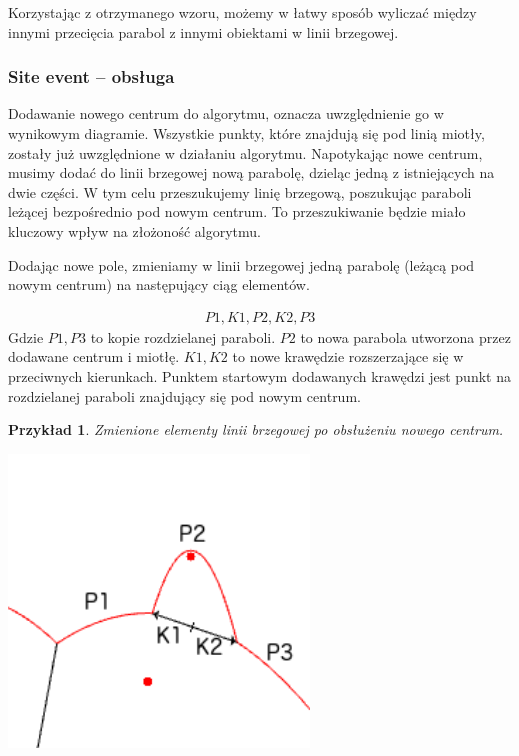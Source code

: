 \documentclass[declaration,shortabstract, inz]{iithesis}
\theoremstyle{definition} \newtheorem{definition}{Definicja}[]
\theoremstyle{plain} \newtheorem{remark}[definition]{Obserwacja}
\theoremstyle{plain} \newtheorem{theorem}[definition]{Twierdzenie}
\theoremstyle{plain} \newtheorem{example}{Przykład}[definition]
\theoremstyle{plain} \newtheorem{lemma}[definition]{Lemat}
\begin{document}
Korzystając z otrzymanego wzoru, możemy w łatwy sposób wyliczać między innymi przecięcia parabol z innymi obiektami w linii brzegowej.

\subsubsection{Site event -- obsługa}
\label{sec:site}
Dodawanie nowego centrum do algorytmu, oznacza uwzględnienie go w wynikowym diagramie. Wszystkie punkty, które znajdują się pod linią miotły, zostały już uwzględnione w działaniu algorytmu. Napotykając nowe centrum, musimy dodać do linii brzegowej nową parabolę, dzieląc jedną z istniejących na dwie części. W tym celu przeszukujemy linię brzegową, poszukując paraboli leżącej bezpośrednio pod nowym centrum. To przeszukiwanie będzie miało kluczowy wpływ na złożoność algorytmu. 

Dodając nowe pole, zmieniamy w linii brzegowej jedną parabolę (leżącą pod nowym centrum) na następujący ciąg elementów.

\begin{align}
 	P1, K1, P2, K2, P3
\end{align}
Gdzie $P1, P3$ to kopie rozdzielanej paraboli. $P2$ to nowa parabola utworzona przez dodawane centrum i miotłę. $K1, K2$ to nowe krawędzie rozszerzające się w przeciwnych kierunkach. Punktem startowym dodawanych krawędzi jest punkt na rozdzielanej paraboli znajdujący się pod nowym centrum.

\begin{example}
	Zmienione elementy linii brzegowej po obsłużeniu nowego centrum.
	
	\begin{center}
		\includegraphics[width=0.6\textwidth]{ExampleSiteEvent}
	\end{center}
\end{example}
\end{document}
